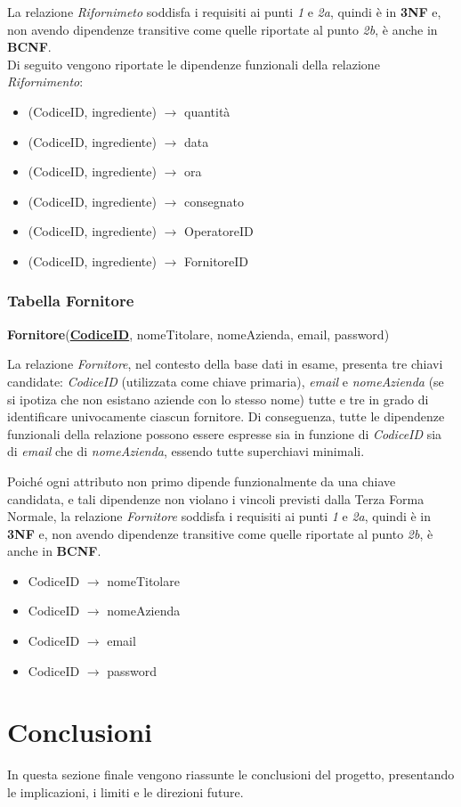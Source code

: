 \documentclass[12pt,a4paper]{article}
\begin{document}
    \noindent
    La relazione \textit{Rifornimeto} soddisfa i requisiti ai punti \textit{1} e \textit{2a}, quindi è in \textbf{3NF} e, non avendo dipendenze transitive come quelle riportate al punto \textit{2b}, è anche in \textbf{BCNF}.\\
    Di seguito vengono riportate le dipendenze funzionali della relazione \textit{Rifornimento}:
    \begin{itemize}[leftmargin=1em, label=$\circ$]
        \item (CodiceID, ingrediente) $\rightarrow$ quantità
        \item (CodiceID, ingrediente) $\rightarrow$ data
        \item (CodiceID, ingrediente) $\rightarrow$ ora
        \item (CodiceID, ingrediente) $\rightarrow$ consegnato
        \item (CodiceID, ingrediente) $\rightarrow$ OperatoreID
        \item (CodiceID, ingrediente) $\rightarrow$ FornitoreID
    \end{itemize}


    \subsubsection*{Tabella Fornitore}
    \begin{tcolorbox}[
        colback=gray!8,
        colframe=black!30,
        title=
    ]
        \textbf{Fornitore}(\textbf{\uline{CodiceID}}, nomeTitolare, nomeAzienda, email, password) 
    \end{tcolorbox}
    
    \noindent
    La relazione \textit{Fornitore}, nel contesto della base dati in esame, presenta tre chiavi candidate: \textit{CodiceID} (utilizzata come chiave primaria), \textit{email} e \textit{nomeAzienda} (se si ipotiza che non esistano aziende con lo stesso nome) tutte e tre in grado di identificare univocamente ciascun fornitore. Di conseguenza, tutte le dipendenze funzionali della relazione possono essere espresse sia in funzione di \textit{CodiceID} sia di \textit{email} che di \textit{nomeAzienda}, essendo tutte superchiavi minimali.

    \vspace{8pt}
    \noindent
    Poiché ogni attributo non primo dipende funzionalmente da una chiave candidata, e tali dipendenze non violano i vincoli previsti dalla Terza Forma Normale, la relazione \textit{Fornitore} soddisfa i requisiti ai punti \textit{1} e \textit{2a}, quindi è in \textbf{3NF} e, non avendo dipendenze transitive come quelle riportate al punto \textit{2b}, è anche in \textbf{BCNF}.
    \begin{itemize}[leftmargin=1em, label=$\circ$]
        \item CodiceID $\rightarrow$ nomeTitolare
        \item CodiceID $\rightarrow$ nomeAzienda
        \item CodiceID $\rightarrow$ email
        \item CodiceID $\rightarrow$ password
    \end{itemize}
    

    \newpage
    \section{Conclusioni}
    In questa sezione finale vengono riassunte le conclusioni del progetto, presentando le implicazioni, i limiti e le direzioni future.
\end{document}
